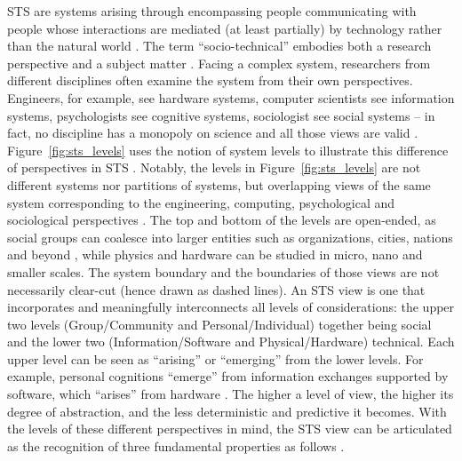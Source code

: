 STS are systems arising through encompassing people communicating with people whose interactions are mediated (at least partially) by technology rather than the natural world \cite{Whitworth2009}.
The term ``socio-technical'' embodies both a research perspective and a subject matter \cite{Lee2001}. Facing a complex system, researchers from different disciplines often examine the system from their own perspectives. Engineers, for example, see hardware systems, computer scientists see information systems, psychologists see cognitive systems, sociologist see social systems -- in fact, no discipline has a monopoly on science and all those views are valid \cite{Whitworth2013}. 
Figure~\ref{fig:sts_levels} uses the notion of system levels to illustrate this  difference of perspectives in STS \cite{Whitworth2009,Whitworth2013}. Notably, the levels in Figure~\ref{fig:sts_levels} are not different systems nor partitions of systems, but overlapping views of the same system corresponding to the engineering, computing, psychological and sociological perspectives \cite{Whitworth2009}. The top and bottom of the levels are open-ended, 
as social groups can coalesce into larger entities such as organizations, cities, nations and beyond \cite{Whitworth2009a}, while physics and hardware can be studied in micro, nano and smaller scales. The system boundary and the boundaries of those views are not necessarily clear-cut (hence drawn as dashed lines). An STS view is one that incorporates and meaningfully interconnects all levels of considerations: the upper two levels (Group/Community and Personal/Individual) together being social and the lower two (Information/Software and Physical/Hardware) technical. Each upper level can be seen as   ``arising'' or ``emerging'' from the lower levels. For example, personal cognitions ``emerge'' from information exchanges supported by software, which ``arises'' from hardware \cite{Whitworth2009}. The higher a level of view, the higher its degree of abstraction, and the less deterministic and predictive it becomes.  
% 
With the levels of these different perspectives in mind, the STS view can be articulated as the recognition of three fundamental properties as follows \cite{Sawyer2014}. 
%
%
